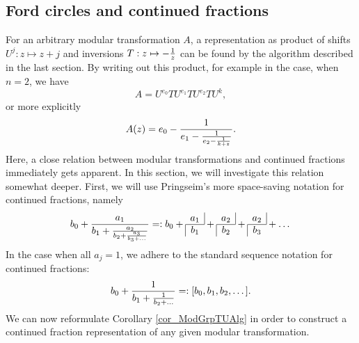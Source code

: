 \subsection{Ford circles and continued fractions}

For an arbitrary modular transformation $A$, a representation as product of shifts $U^j: z \mapsto z+j$ and inversions $T: z \mapsto -\frac{1}{z}$ can be found by the algorithm described in the last section. By writing out this product, for example in the case, when $n=2$, we have
\begin{equation*}
A = U^{e_0}T U^{e_1}T U^{e_2}T U^k,
\end{equation*}
or more explicitly
\begin{equation*}
A(z) = e_0 - \frac{1}{e_1 - \frac{1}{e_2 - \frac{1}{k + z}}}.
\end{equation*}
Here, a close relation between modular transformations and continued fractions immediately gets apparent. In this section, we will investigate this relation somewhat deeper. 
First, we will use Pringseim's more space-saving notation for continued fractions, namely
\begin{equation}
\label{eqn_ConFracNotation}
b_0 + \frac{a_1}{b_1 + \frac{a_2}{b_2 + \frac{a_3}{b_3 + \dots}}} =: 
b_0 + \cfr{a_1}{b_1} + \cfr{a_2}{b_2} + \cfr{a_2}{b_3} + \dots
\end{equation}
In the case when all $a_j = 1$, we adhere to the standard sequence notation for continued fractions:
\begin{equation*}
b_0 + \frac{1}{b_1 + \frac{1}{b_2 + \dots}} =: [b_0,b_1,b_2,\dots].
\end{equation*}
We can now reformulate Corollary \ref{cor_ModGrpTUAlg} in order to construct a continued fraction representation of any given modular transformation.

